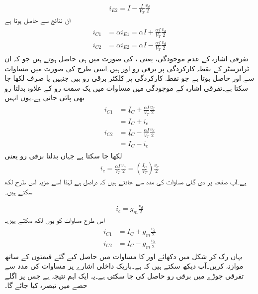\begin{align}\label{مساوات_تفرقی_جوڑا_دوسری_برقی_رو}
i_{E2}=I-\frac{I}{V_T}\frac{v_d}{2}
\end{align}
ان نتائج سے حاصل ہوتا ہے
\begin{gather}
\begin{aligned} \label{مساوات_تفرقی_پہلی_رو_تسلسل_کے_دو_جز}
i_{C1}&=\alpha i_{E1}=\alpha I +\frac{\alpha I}{V_T} \frac{v_d}{2}\\
i_{C2}&=\alpha i_{E2}=\alpha I -\frac{\alpha I}{V_T} \frac{v_d}{2}
\end{aligned}
\end{gather}
تفرقی اشارہ کے عدم موجودگی، یعنی  ، کی صورت میں   ہی حاصل ہوتے ہیں جو کہ ان ٹرانزسٹر کے نقطہ کارکردگی پر برقی رو  اور   ہیں۔اسی طرح  کی صورت میں مساوات   سے  اور  حاصل ہوتا ہے جو نقطہ کارکردگی پر کلکٹر برقی رو ہیں جنہیں  یا صرف  لکھا جا سکتا ہے۔تفرقی اشارہ کے موجودگی میں مساوات  میں یک سمت رو کے علاوہ بدلتا رو بھی پائی جاتی ہے۔یوں انہیں
\begin{gather}
\begin{aligned}
i_{C1}&=ِI_{C}+\frac{\alpha I}{V_T} \frac{v_d}{2}\\
&=I_{C}+i_c\\
i_{C2}&=ِI_{C}-\frac{\alpha I}{V_T} \frac{v_d}{2}\\
&=I_{C}-i_c
\end{aligned}
\end{gather}
لکھا جا سکتا ہے جہاں   بدلتا برقی رو یعنی
\begin{align}
i_c=\frac{\alpha I}{V_T}\frac{v_d}{2}=\left(\frac{I_{C}}{V_T}\right) \frac{v_d}{2}
\end{align}
ہے۔آپ صفحہ  پر  دی گئی مساوات  کی مدد سے جانتے ہیں کہ  دراصل  ہے لہٰذا اسے مزید اس طرح لکھ سکتے ہیں۔

\begin{align} \label{مساوات_تفرقی_اشاراتی_رو}
i_c=g_m \frac{v_d}{2}
\end{align}
اس طرح مساوات  کو یوں لکھ سکتے ہیں۔
\begin{gather}
\begin{aligned}
i_{C1}&=I_{C}+g_m \frac{v_d}{2}\\
i_{C2}&=I_{C} - g_m \frac{v_d}{2}
\end{aligned}
\end{gather}
یہاں رک کر شکل   میں دکھائے  اور  کا مساوات  میں حاصل کیے گئے قیمتوں کے ساتھ موازنہ کریں۔آپ دیکھ سکتے ہیں کہ  ہے۔باریک داخلی اشارے پر  مساوات   کی مدد سے  تفرقی جوڑے میں برقی رو   حاصل کی جا سکتی ہے۔یہ ایک اہم نتیجہ ہے جس پر اگلے حصے میں تبصرہ کیا جائے گا۔


